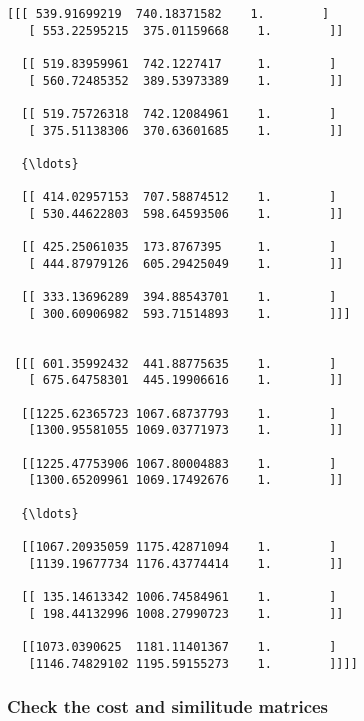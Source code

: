 \documentclass[11pt]{article}
\begin{document}
\begin{Verbatim}[commandchars=\\\{\}]
 [[[ 539.91699219  740.18371582    1.        ]
   [ 553.22595215  375.01159668    1.        ]]

  [[ 519.83959961  742.1227417     1.        ]
   [ 560.72485352  389.53973389    1.        ]]

  [[ 519.75726318  742.12084961    1.        ]
   [ 375.51138306  370.63601685    1.        ]]

  {\ldots}

  [[ 414.02957153  707.58874512    1.        ]
   [ 530.44622803  598.64593506    1.        ]]

  [[ 425.25061035  173.8767395     1.        ]
   [ 444.87979126  605.29425049    1.        ]]

  [[ 333.13696289  394.88543701    1.        ]
   [ 300.60906982  593.71514893    1.        ]]]


 [[[ 601.35992432  441.88775635    1.        ]
   [ 675.64758301  445.19906616    1.        ]]

  [[1225.62365723 1067.68737793    1.        ]
   [1300.95581055 1069.03771973    1.        ]]

  [[1225.47753906 1067.80004883    1.        ]
   [1300.65209961 1069.17492676    1.        ]]

  {\ldots}

  [[1067.20935059 1175.42871094    1.        ]
   [1139.19677734 1176.43774414    1.        ]]

  [[ 135.14613342 1006.74584961    1.        ]
   [ 198.44132996 1008.27990723    1.        ]]

  [[1073.0390625  1181.11401367    1.        ]
   [1146.74829102 1195.59155273    1.        ]]]]

    \end{Verbatim}

    \hypertarget{check-the-cost-and-similitude-matrices}{%
\subsubsection{Check the cost and similitude
matrices}\label{check-the-cost-and-similitude-matrices}}
\end{document}
